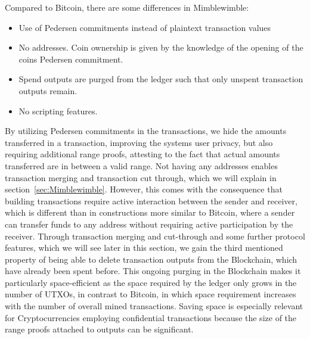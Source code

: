 Compared to Bitcoin, there are some differences in Mimblewimble:
\begin{itemize}
    \item Use of Pedersen commitments instead of plaintext transaction values 
    \item No addresses. Coin ownership is given by the knowledge of the opening of the coins Pedersen commitment. 
    \item Spend outputs are purged from the ledger such that only unspent transaction outputs remain.
    \item No scripting features.
\end{itemize}


By utilizing Pedersen commitments in the transactions, we  hide the amounts transferred in a transaction,
improving the systems user privacy, but also requiring additional range proofs, attesting to the fact that actual amounts transferred are in between a valid range. 
Not having any addresses enables transaction merging and transaction cut through,  which we will explain in section~\ref{sec:Mimblewimble}.
However, this comes with the consequence that building transactions require active interaction between the sender and receiver,
which is different than in constructions more similar to Bitcoin, where a sender can transfer funds to any address without requiring active participation by the receiver. 
Through transaction merging and cut-through and some further protocol features, which we will see later in this section, we gain the third mentioned property of being able
to delete transaction outputs from the Blockchain, which have already been spent before. This ongoing purging in the Blockchain makes it particularly space-efficient as the
space required by the ledger only grows in the number of UTXOs, in contrast to Bitcoin, in which space requirement increases with the number of overall mined transactions.
Saving space is especially relevant for Cryptocurrencies employing confidential transactions because the size of the range proofs attached to outputs can be significant.

